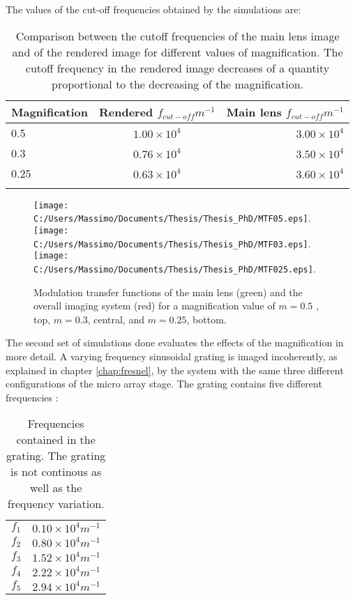 The values of the cut-off frequencies obtained by the simulations are:
\begin{table}
	\centering
	\begin{tabular}{l|c|r}
		Magnification & Rendered $f_{cut-off}m^{-1}$ & Main lens $f_{cut-off}m^{-1}$\\ \hline
		0.5 & $1.00 \times 10^{4}$ &  $3.00 \times 10^{4}$ \\ \hline
		0.3 & $0.76 \times 10^{4}$ &  $3.50 \times 10^{4}$ \\ \hline
		0.25 & $0.63\times 10^{4}$ &  $3.60\times 10^{4}$  \\ 
		\label{tab:6}
	\end{tabular}
	\caption{\label{tab:cutoff} Comparison between the cutoff frequencies of the main lens image and of the rendered image for different values of magnification. The cutoff frequency in the rendered image decreases of a quantity proportional to the decreasing of the magnification.}
\end{table} 
\begin{figure}[H]
	\centering
	\texttt{[image: C:/Users/Massimo/Documents/Thesis/Thesis\_PhD/MTF05.eps]}.
	\texttt{[image: C:/Users/Massimo/Documents/Thesis/Thesis\_PhD/MTF03.eps]}.
	\texttt{[image: C:/Users/Massimo/Documents/Thesis/Thesis\_PhD/MTF025.eps]}.
	\caption{\label{fig:MTF} Modulation transfer functions of the main lens (green) and the overall imaging system (red) for a magnification value of $m = 0.5$ , top, $m = 0.3$, central, and $m = 0.25$, bottom.}
\end{figure}
The second set of simulations done evaluates the effects of the magnification in more detail. A varying frequency sinusoidal grating is imaged incoherently, as explained in chapter \ref{chap:fresnel}, by the system with the same three different configurations of the micro array stage. The grating contains five different frequencies :
\begin{table}
\begin{tabular}{l|r}
	\centering
	$f_1$ & $0.10\times 10^4 m^{-1}$ \\
	$f_2$ & $0.80\times 10^4 m^{-1}$ \\
	$f_3$ & $1.52\times 10^4 m^{-1}$ \\
	$f_4$ & $2.22\times 10^4 m^{-1}$ \\
	$f_5$ & $2.94\times 10^4 m^{-1}$ \\
\end{tabular}
\caption{\label{tab:grating} Frequencies contained in the grating. The grating is not continous as well as the frequency variation.}
\end{table}
